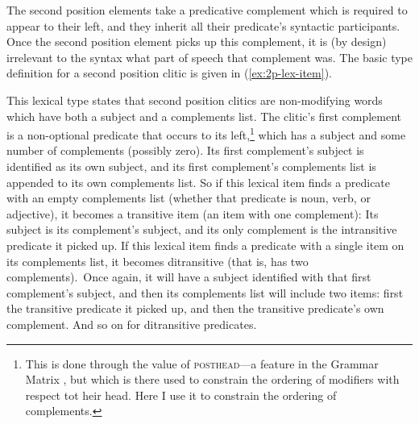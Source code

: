 The second position elements take a predicative complement which is required to appear to their left, and they inherit all their predicate's syntactic participants. Once the second position element picks up this complement, it is (by design) irrelevant to the syntax what part of speech that complement was. The basic type definition for a second position clitic is given in (\ref{ex:2p-lex-item}).

\begin{singlespacing}
\ex \label{ex:2p-lex-item}
\xe
\end{singlespacing}

This lexical type states that second position clitics are non-modifying words which have both a subject and a complements list. The clitic's first complement is a non-optional predicate that occurs to its left,\footnote{This is done through the value of \textsc{posthead}---a feature in the Grammar Matrix \citep{bender2002}, but which is there used to constrain the ordering of modifiers with respect tot heir head. Here I use it to constrain the ordering of complements.} which has a subject and some number of complements (possibly zero). Its first complement's subject is identified as its own subject, and its first complement's complements list is appended to its own complements list. So if this lexical item finds a predicate with an empty complements list (whether that predicate is noun, verb, or adjective), it becomes a transitive item (an item with one complement): Its subject is its complement's subject, and its only complement is the intransitive predicate it picked up. If this lexical item finds a predicate with a single item on its complements list, it becomes ditransitive (that is, has two complements). Once again, it will have a subject identified with that first complement's subject, and then its complements list will include two items: first the transitive predicate it picked up, and then the transitive predicate's own complement. And so on for ditransitive predicates.

